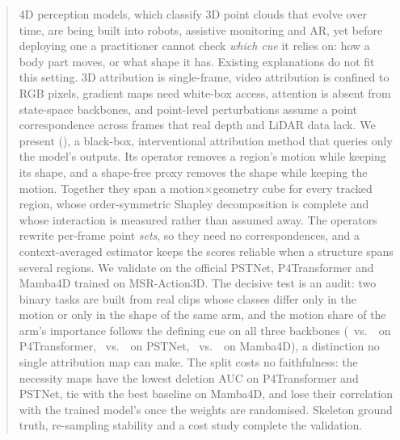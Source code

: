 \begin{abstract}
4D perception models, which classify 3D point clouds that evolve over time, are being built into robots, assistive monitoring and AR, yet before deploying one a practitioner cannot check \emph{which cue} it relies on: how a body part moves, or what shape it has. Existing explanations do not fit this setting. 3D attribution is single-frame, video attribution is confined to RGB pixels, gradient maps need white-box access, attention is absent from state-space backbones, and point-level perturbations assume a point correspondence across frames that real depth and LiDAR data lack. We present \methodlong (\method), a black-box, interventional attribution method that queries only the model's outputs. Its \frz operator removes a region's motion while keeping its shape, and a shape-free proxy removes the shape while keeping the motion. Together they span a motion$\times$geometry cube for every tracked region, whose order-symmetric Shapley decomposition is complete and whose interaction is measured rather than assumed away. The operators rewrite per-frame point \emph{sets}, so they need no correspondences, and a context-averaged estimator keeps the scores reliable when a structure spans several regions. We validate \method on the official PSTNet, P4Transformer and Mamba4D trained on MSR-Action3D. The decisive test is an audit: two binary tasks are built from real clips whose classes differ only in the motion or only in the shape of the same arm, and the motion share of the arm's importance follows the defining cue on all three backbones (\NumXMotShare\ vs.\ \NumXGeoShare\ on P4Transformer, \NumXPstMotShare\ vs.\ \NumXPstGeoShare\ on PSTNet, \NumXMbaMotShare\ vs.\ \NumXMbaGeoShare\ on Mamba4D), a distinction no single attribution map can make. The split costs no faithfulness: the necessity maps have the lowest deletion AUC on P4Transformer and PSTNet, tie with the best baseline on Mamba4D, and lose their correlation with the trained model's once the weights are randomised. Skeleton ground truth, re-sampling stability and a cost study complete the validation.
\end{abstract}
